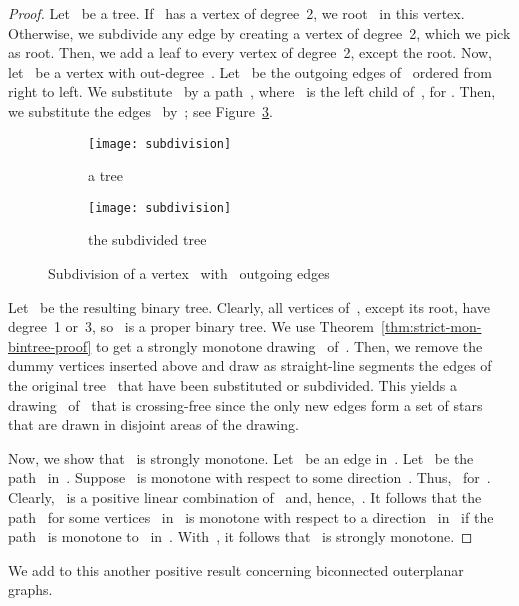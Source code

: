 \documentclass[a4paper,11pt]{article}
\theoremstyle{plain}
\begin{document}
\begin{proof}
  Let~ be a tree. If~ has a vertex of degree~2, we root~ in this 
  vertex. Otherwise, we subdivide any edge by creating a vertex of degree~2, 
  which we pick as root. Then, we add a leaf to every vertex of degree~2, 
  except the root. Now, let~ be a vertex with out-degree~. 
  Let~ be the outgoing edges of~ ordered from right to 
  left. We substitute~ by a path~, 
  where~ is the left child of~, for . Then, we 
  substitute the edges~ by~; see 
  Figure~\ref{fig:subdivision}.
  
  \begin{figure}[tb]
    \hfill
    \begin{subfigure}[b]{.45\textwidth}
      \centering
      \texttt{[image: subdivision]}
      \caption{a tree~}
      \label{fig:subdivision-1}
    \end{subfigure}
    \hfill
    \begin{subfigure}[b]{.45\textwidth}
      \centering
      \texttt{[image: subdivision]}
      \caption{the subdivided tree~}
      \label{fig:subdivision-2}
    \end{subfigure}
    \hfill
    \caption{Subdivision of a vertex~ with~ outgoing edges}
    \label{fig:subdivision}
  \end{figure}
   
  Let~ be the resulting binary tree.  Clearly, all vertices of~, 
  except its root, have degree~1 or~3, so~ is a proper binary tree.
  We use Theorem~\ref{thm:strict-mon-bintree-proof} to get a strongly monotone
  drawing~ of~. Then, we remove the dummy vertices inserted
  above and draw as straight-line segments the edges of the original
  tree~ that have been substituted or subdivided.
  This yields a drawing~ of~ that is crossing-free
  since the only new edges form a set of stars that are drawn in disjoint
  areas of the drawing.
  
  Now, we show that~ is strongly monotone. Let~ be an edge
  in~. Let~ be the path~ in~.
  Suppose~ is monotone with respect to some direction~. 
  Thus,~ 
  for~. 
  Clearly,~
  is a positive linear combination
  of~
  and, hence,~.
  It follows that the path~ for some vertices~ in~ is monotone
  with respect to a direction~ in~ if the path~ is
  monotone to~ in~. With~, 
  it follows that~ is strongly monotone.
\end{proof}

We add to this another positive result concerning biconnected
outerplanar graphs.
\end{document}
